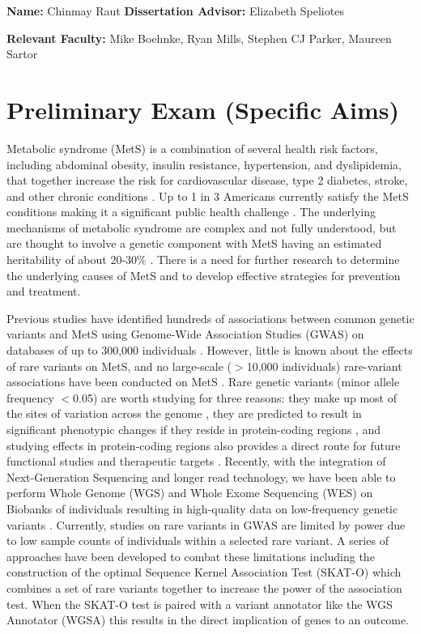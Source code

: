 \documentclass[11pt]{article}
\begin{document}
\noindent
\textbf{Name:} Chinmay Raut \textbf{Dissertation Advisor:} Elizabeth Speliotes

\noindent
\textbf{Relevant Faculty: } Mike Boehnke, Ryan Mills, Stephen CJ Parker, Maureen Sartor

\section*{Preliminary Exam (Specific Aims)}

Metabolic syndrome (MetS) is a combination of several health risk factors, including abdominal obesity, insulin resistance, hypertension, and dyslipidemia, that together increase the risk for cardiovascular disease, type 2 diabetes, stroke, and other chronic conditions \cite{pmid29480368}. Up to 1 in 3 Americans currently satisfy the MetS conditions making it a significant public health challenge \cite{pmid29480368}. The underlying mechanisms of metabolic syndrome are complex and not fully understood, but are thought to involve a genetic component with MetS having an estimated heritability of about 20-30\% \cite{Graziano2019}. There is a need for further research to determine the underlying causes of MetS and to develop effective strategies for prevention and treatment.

Previous studies have identified hundreds of associations between common genetic variants and MetS using Genome-Wide Association Studies (GWAS) on databases of up to 300,000 individuals \cite{pmid31589552}. However, little is known about the effects of rare variants on MetS, and no large-scale ($>$10,000 individuals) rare-variant associations have been conducted on MetS \cite{Lee2018}. Rare genetic variants (minor allele frequency $<$0.05) are worth studying for three reasons: they make up most of the sites of variation across the genome \cite{pmid34662886}, they are predicted to result in significant phenotypic changes if they reside in protein-coding regions \cite{pmid34662886}, and studying effects in protein-coding regions also provides a direct route for future functional studies and therapeutic targets \cite{doi:10.1056/NEJMoa2117872}. Recently, with the integration of Next-Generation Sequencing and longer read technology, we have been able to perform Whole Genome (WGS) and Whole Exome Sequencing (WES) on Biobanks of individuals resulting in high-quality data on low-frequency genetic variants \cite{pmid34662886}. Currently, studies on rare variants in GWAS are limited by power due to low sample counts of individuals within a selected rare variant. A series of approaches have been developed to combat these limitations including the construction of the optimal Sequence Kernel Association Test (SKAT-O) \cite{pmid22863193} which combines a set of rare variants together to increase the power of the association test. When the SKAT-O test is paired with a variant annotator like the WGS Annotator (WGSA) \cite{pmid26395054} this results in the direct implication of genes to an outcome.
\end{document}
